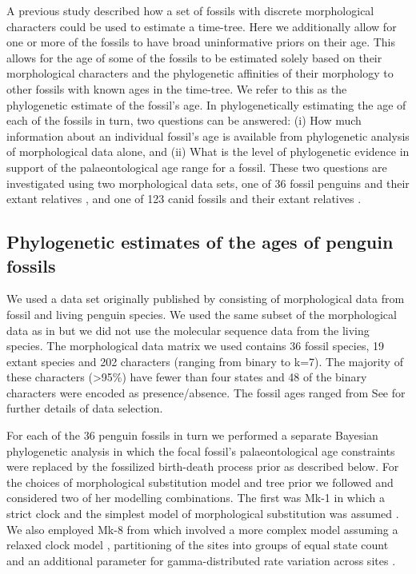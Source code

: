 \documentclass[11pt]{article}
\newcommand{\Mstrict}{{Mk-1}}
\newcommand{\Mrelaxed}{{Mk-8}}
\begin{document}
A previous study described how a set of fossils with discrete morphological characters could be used to estimate a time-tree. 
Here we additionally allow for one or more of the fossils to have broad uninformative priors on their age. 
This allows for the age of some of the fossils to be estimated solely based on their morphological characters and the phylogenetic affinities of their morphology to other fossils with known ages in the time-tree. 
We refer to this as the phylogenetic estimate of the fossil's age. 
In phylogenetically estimating the age of each of the fossils in turn, two questions can be answered: (i) How much information about an individual fossil's age is available from phylogenetic analysis of morphological data alone, and (ii) What is the level of phylogenetic evidence in support of the palaeontological age range for a fossil.
These two questions are investigated using two morphological data sets, one of 36 fossil penguins and their extant relatives \cite{ksepka2010,ksepka2012,gavryushkina2015bayesian}, and one of 123 canid fossils and their extant relatives \cite{Slater2015}.

\subsection*{Phylogenetic estimates of the ages of penguin fossils}

We used a data set originally published by \cite{ksepka2012} consisting of morphological data from fossil and living penguin 
species. 
We used the same subset of the morphological data as in \cite{gavryushkina2015bayesian} but we did not use the molecular sequence data from the living species. 
The morphological data matrix we used contains 36 fossil species, 19 extant species and 202 characters (ranging from binary to k=7). 
The majority of these characters (\textgreater 95\%) have fewer than four states and 48 of the binary characters were encoded as presence/absence. 
The fossil ages ranged from 
See \cite{gavryushkina2015bayesian} for further details of data selection.

For each of the 36 penguin fossils in turn we performed a separate Bayesian phylogenetic analysis in which the focal fossil's palaeontological age constraints were replaced by 
the fossilized birth-death process prior as described below.  
For the choices of morphological substitution model and tree prior we followed \cite{gavryushkina2015bayesian} and considered two of her modelling combinations. 
The first was \Mstrict{} in which a strict clock and the simplest model of morphological substitution was assumed \cite{Lewis2001}.
We also employed \Mrelaxed{} from \cite{gavryushkina2015bayesian} which involved a more complex model assuming a relaxed clock model \cite{Drummond2006}, partitioning of the sites into groups of equal state count and an additional parameter for gamma-distributed rate variation across sites \cite{yang:1994ma}.
\end{document}
